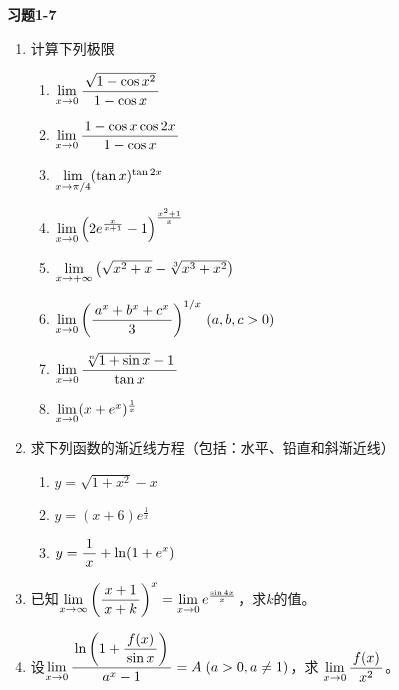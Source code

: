 \begin{ext}
	{\centering\bf 习题1-7}
	
	\begin{enumerate}  
	  \item 计算下列极限
	  \begin{enumerate}[(1)]
		\item $\lim\limits_{x\to{0}}\displaystyle\frac{\,{\sqrt{1-\cos x^2}}\,}{\,{1-\cos x}\,}$ 
		\item $\lim\limits_{x\to{0}}\displaystyle\frac{\,{1-\cos x\cos 2x}\,}{\,{1-\cos x}\,}$
		\item $\lim\limits_{x\to{\pi /4}}(\tan x)^{\tan 2x}$ 
		\item $\lim\limits_{x\to{0}}\left(2e^{\frac{x}{x+1}}-1\right)^{\frac{x^2+1}{x}}$ 
		\item $\lim\limits_{x\to{+\infty}}\left(\sqrt{x^2+x}-\sqrt[3]{x^3+x^2}\right)$ 
		\item $\lim\limits_{x\to{0}}\left(\displaystyle\frac{\,{a^x+b^x+c^x}\,}{\,{3}\,}\right)^{1/x}\,(a,b,c>0)$  
		\item $\lim\limits_{x\to{0}}\displaystyle\frac{\,{\sqrt[n]{1+\sin x}-1}\,}{\,{\tan x}\,}$
		\item $\lim\limits_{x\to{0}}(x+e^x)^{\frac1x}$
	  \end{enumerate}
	  \item 求下列函数的渐近线方程（包括：水平、铅直和斜渐近线）
	  \begin{enumerate}[(1)]
	    \item $y=\sqrt{1+x^2}-x$
	    \item $y=(x+6)e^{\frac1x}$
	    \item $y=\displaystyle\frac{\,{1}\,}{\,{x}\,}+\ln(1+e^x)$
	  \end{enumerate}
	  \item 已知$\lim\limits_{x\to{\infty}}\left(\displaystyle\frac{\,{x+1}\,}{\,{x+k}\,}\right)^x
	  =\lim\limits_{x\to{0}}e^{\frac{\sin 4x}x}$，求$k$的值。
	  \item 设$\lim\limits_{x\to{0}}\displaystyle\frac{\,{\ln\left(1+\displaystyle\frac{\,{f(x)}\,}{\,{\sin x}\,}\right)}\,}{\,{a^x-1}\,}=A
	  \;(a>0,a\ne1)$，求 $\lim\limits_{x\to{0}}\displaystyle\frac{\,{f(x)}\,}{\,{x^2}\,}$。
	\end{enumerate}
\end{ext}

